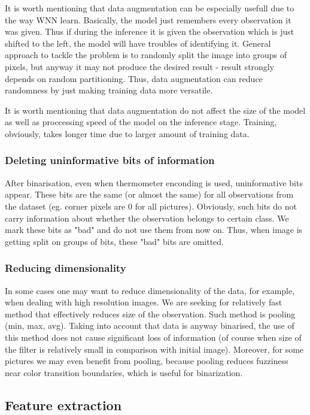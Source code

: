 \documentclass{article}[12pt]
\begin{document}
It is worth mentioning that data augmentation can be especially usefull due to the way WNN learn. Basically, the model just remembers every observation it was given. Thus if during the inference it is given the observation which is just shifted to the left, the model will have troubles of identifying it. General approach to tackle the problem is to randomly split the image into groups of pixels, but anyway it may not produce the desired result - result strongly depends on random partitioning. Thus, data augmentation can reduce randomness by just making training data more versatile.

It is worth mentioning that data augmentation do not affect the size of the model as well as proccessing speed of the model on the inference stage. Training, obviously, takes longer time due to larger amount of training data.

\subsubsection*{Deleting uninformative bits of information}
After binarisation, even when thermometer enconding is used, uninformative bits appear. These bits are the same (or almost the same) for all observations from the dataset (eg. corner pixels are 0 for all pictures). Obviously, such bits do not carry information about whether the observation belongs to certain class. We mark these bits as "bad" and do not use them from now on. Thus, when image is getting split on groups of bits, these "bad" bits are omitted.

\subsubsection*{Reducing dimensionality}
In some cases one may want to reduce dimensionality of the data, for example, when dealing with high resolution images. We are seeking for relatively fast method that effectively reduces size of the observation. Such method is pooling (min, max, avg). Taking into account that data is anyway binarised, the use of this method does not cause significant loss of information (of course when size of the filter is relatively small in comparison with initial image). Moreover, for some pictures we may even benefit from pooling, because pooling reduces fuzziness near color transition boundaries, which is useful for binarization.

\subsection{Feature extraction}
\end{document}

